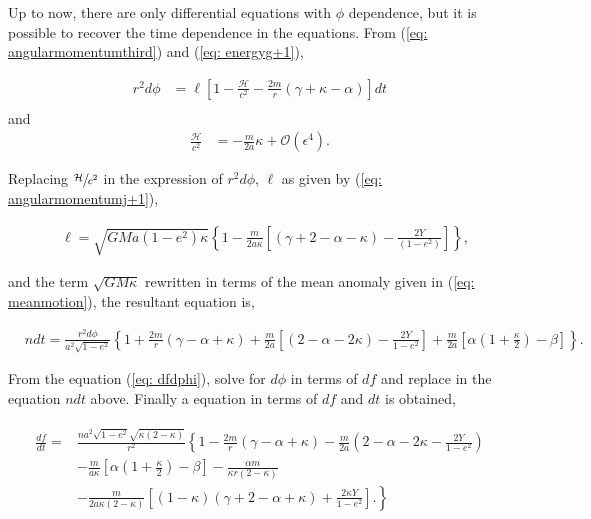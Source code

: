 Up to now, there are only differential equations with $\phi$ dependence, but it is possible to recover the time dependence in the equations. From (\ref{eq: angularmomentumthird}) and (\ref{eq: energyg+1}),

\begin{align*}
r^2 d\phi&=\ell\left[1-\frac{\mathcal{H}}{c^2}-\frac{2m}{r}\left(\gamma+\kappa-\alpha\right)\right]dt\\
\end{align*}
and
\begin{align*} 
	\frac{\mathcal{H}}{c^2} &= - \frac{m}{2a}\kappa + \mathcal{O}(\epsilon^4).
\end{align*}

Replacing $\sfrac{\mathcal{H}}{c^2}$ in the expression of $r^2 d\phi$, $\ell$ as given by (\ref{eq: angularmomentumj+1}),

\begin{align}
	&\ell = \sqrt{GMa(1-e^2)\kappa}\left\{1-\frac{m}{2a\kappa}\left[(\gamma+2-\alpha-\kappa)-\frac{2Y}{(1-e^2)}\right]\right\},
\end{align}

and the term $\sqrt{GM\kappa}$ rewritten in terms of the mean anomaly given in (\ref{eq: meanmotion}), the resultant equation is,

\begin{align}
&ndt = \frac{r^2d\phi}{a^2\sqrt{1-e^2}}\left\{1+\frac{2m}{r}(\gamma-\alpha+\kappa)+\frac{m}{2a}\left[(2-\alpha-2\kappa)-\frac{2Y}{1-e^2}\right]+\frac{m}{2a}\left[\alpha\left(1+\frac{\kappa}{2} \right)-\beta\right]\right\}.
\end{align}

From the equation (\ref{eq: dfdphi}), solve for $d\phi$ in terms of $df$ and replace in the equation $ndt$ above. Finally a equation in terms of $df$ and $dt$ is obtained,

\begin{align}
\begin{split}
\frac{df}{dt} =& \frac{na^2\sqrt{1-e^2}\sqrt{\kappa(2-\kappa)}}{r^2}\left\{1-\frac{2m}{r}(\gamma-\alpha+\kappa)-\frac{m}{2a}\left(2-\alpha-2\kappa-\frac{2Y}{1-e^2}\right)\right.\\
&\left.-\frac{m}{a\kappa}\left[\alpha\left(1+\frac{\kappa}{2}\right)-\beta\right]-\frac{\alpha m}{\kappa r (2-\kappa)} \right.\\
&\left.-\frac{m}{2a\kappa (2-\kappa)}\left[(1-\kappa)(\gamma+2-\alpha+\kappa)+\frac{2\kappa Y}{1-e^2}\right].\right\}
	\end{split}
	\end{align}

